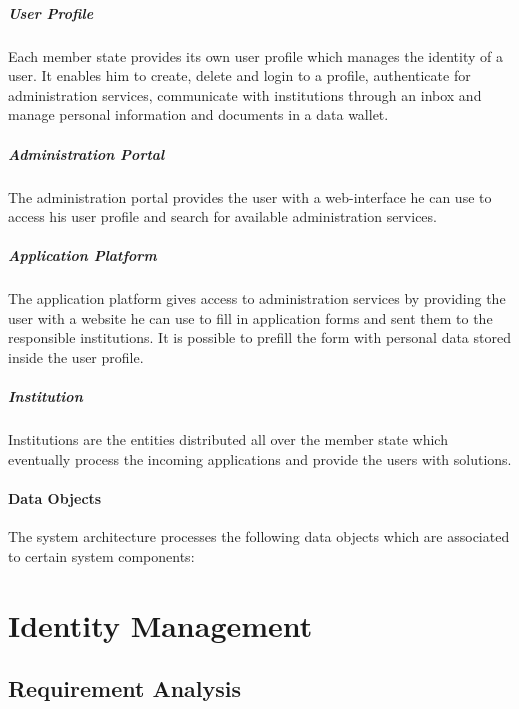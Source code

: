 \documentclass[
     12pt,         %
     a4paper,      %
     BCOR=10mm,version=first,     %
     DIV=14,version=first,        %
     ]{scrreprt}
\begin{document}
\paragraph{User Profile}
Each member state provides its own user profile which manages the identity of a user. It enables him to create, delete and login to a profile, authenticate for administration services, communicate with institutions through an inbox and manage personal information and documents in a data wallet.

\paragraph{Administration Portal}
The administration portal provides the user with a web-interface he can use to access his user profile and search for available administration services.

\paragraph{Application Platform}
The application platform gives access to administration services by providing the user with a website he can use to fill in application forms and sent them to the responsible institutions. It is possible to prefill the form with personal data stored inside the user profile.

\paragraph{Institution}
Institutions are the entities distributed all over the member state which eventually process the incoming applications and provide the users with solutions.

\subsubsection{Data Objects}
The system architecture processes the following data objects which are associated to certain system components:


\chapter{Identity Management}

\section{Requirement Analysis}
\end{document}
